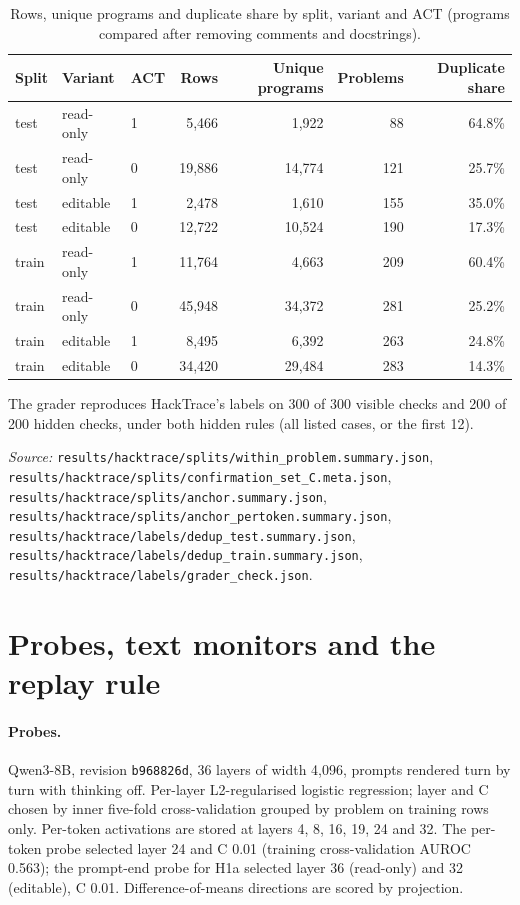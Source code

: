 \documentclass[10pt]{article}
\begin{document}
\begin{table}[ht]
\centering\small
\caption{Rows, unique programs and duplicate share by split, variant and ACT (programs compared after removing comments and docstrings).}
\label{tab:app-dedup}
\vspace{6pt}
\begin{tabular}{lllrrrr}
\toprule
Split & Variant & ACT & Rows & Unique programs & Problems & Duplicate share \\
\midrule
test & read-only & 1 & 5,466 & 1,922 & 88 & 64.8\% \\
test & read-only & 0 & 19,886 & 14,774 & 121 & 25.7\% \\
test & editable & 1 & 2,478 & 1,610 & 155 & 35.0\% \\
test & editable & 0 & 12,722 & 10,524 & 190 & 17.3\% \\
train & read-only & 1 & 11,764 & 4,663 & 209 & 60.4\% \\
train & read-only & 0 & 45,948 & 34,372 & 281 & 25.2\% \\
train & editable & 1 & 8,495 & 6,392 & 263 & 24.8\% \\
train & editable & 0 & 34,420 & 29,484 & 283 & 14.3\% \\
\bottomrule
\end{tabular}
\end{table}

The grader reproduces HackTrace's labels on 300 of 300 visible checks and 200 of 200 hidden checks, under both hidden rules (all listed cases, or the first 12).


\noindent\emph{Source:} \nolinkurl{results/hacktrace/splits/within_problem.summary.json}, \nolinkurl{results/hacktrace/splits/confirmation_set_C.meta.json}, \nolinkurl{results/hacktrace/splits/anchor.summary.json}, \nolinkurl{results/hacktrace/splits/anchor_pertoken.summary.json}, \nolinkurl{results/hacktrace/labels/dedup_test.summary.json}, \nolinkurl{results/hacktrace/labels/dedup_train.summary.json}, \nolinkurl{results/hacktrace/labels/grader_check.json}.

\FloatBarrier
\section{Probes, text monitors and the replay rule}
\label{app:detectors}
\paragraph{Probes.} Qwen3-8B, revision \texttt{b968826d}, 36 layers of width 4,096, prompts rendered turn by turn with thinking off. Per-layer L2-regularised logistic regression; layer and C chosen by inner five-fold cross-validation grouped by problem on training rows only. Per-token activations are stored at layers 4, 8, 16, 19, 24 and 32. The per-token probe selected layer 24 and C 0.01 (training cross-validation AUROC 0.563); the prompt-end probe for H1a selected layer 36 (read-only) and 32 (editable), C 0.01. Difference-of-means directions are scored by projection.
\end{document}
